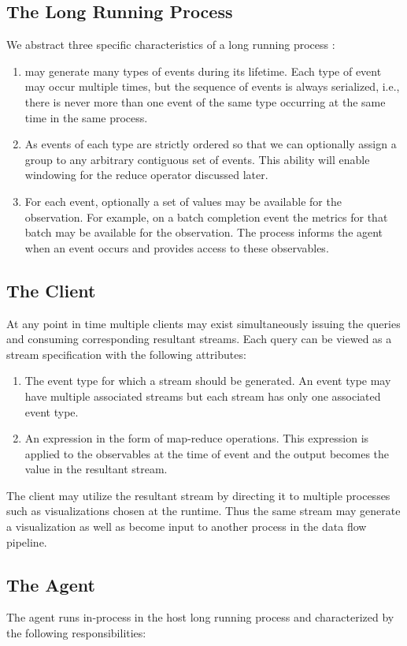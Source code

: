 \documentclass[sigchi]{acmart}
\begin{document}
\subsection{The Long Running Process}
We abstract three specific characteristics of a long running process :
\begin{enumerate}
  \item  may generate many types of events during its lifetime. Each type of event may occur multiple times, but the sequence of events is always serialized, i.e., there is never more than one event of the same type occurring at the same time in the same process.
  \item As events of each type are strictly ordered so that we can optionally assign a group to any arbitrary contiguous set of events. This ability will enable windowing for the reduce operator discussed later.
  \item For each event, optionally a set of values may be available for the observation. For example, on a batch completion event the metrics for that batch may be available for the observation. The process informs the agent when an event occurs and provides access to these observables.
\end{enumerate}
\subsection{The Client}
At any point in time multiple clients may exist simultaneously issuing the queries and consuming corresponding resultant streams. Each query can be viewed as a stream specification with the following attributes:
\begin{enumerate}
  \item The event type for which a stream should be generated. An event type may have multiple associated streams but each stream has only one associated event type.
  \item An expression in the form of map-reduce operations. This expression is applied to the observables at the time of event and the output becomes the value in the resultant stream.
\end{enumerate}

The client may utilize the resultant stream by directing it to multiple processes such as visualizations chosen at the runtime. Thus the same stream may generate a visualization as well as become input to another process in the data flow pipeline.

\subsection{The Agent}
The agent runs in-process in the host long running process  and characterized by the following responsibilities:
\end{document}
